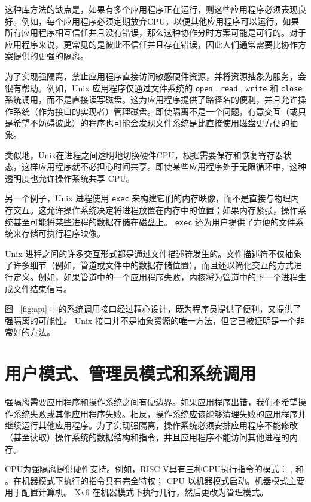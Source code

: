 \documentclass[UTF8]{article}
\begin{document}
这种库方法的缺点是，如果有多个应用程序正在运行，则这些应用程序必须表现良好。例如，每个应用程序必须定期放弃CPU，以便其他应用程序可以运行。如果所有应用程序相互信任并且没有错误，那么这种协作分时方案可能是可行的。对于应用程序来说，更常见的是彼此不信任并且存在错误，因此人们通常需要比协作方案提供的更强的隔离。  

为了实现强隔离，禁止应用程序直接访问敏感硬件资源，并将资源抽象为服务，会很有帮助。例如，Unix 应用程序仅通过文件系统的
    \lstinline{open}    ,
    \lstinline{read}    ,
    \lstinline{write}    和
    \lstinline{close}   系统调用，而不是直接读写磁盘。这为应用程序提供了路径名的便利，并且允许操作系统（作为接口的实现者）管理磁盘。即使隔离不是一个问题，有意交互（或只是希望不妨碍彼此）的程序也可能会发现文件系统是比直接使用磁盘更方便的抽象。  

类似地，Unix在进程之间透明地切换硬件CPU，根据需要保存和恢复寄存器状态，这样应用程序就不必担心时间共享。即使某些应用程序处于无限循环中，这种透明度也允许操作系统共享 CPU。  

另一个例子，Unix 进程使用
    \lstinline{exec}    来构建它们的内存映像，而不是直接与物理内存交互。这允许操作系统决定将进程放置在内存中的位置；如果内存紧张，操作系统甚至可能将某些进程的数据存储在磁盘上。
    \lstinline{exec}   还为用户提供了方便的文件系统来存储可执行程序映像。  

Unix 进程之间的许多交互形式都是通过文件描述符发生的。文件描述符不仅抽象了许多细节（例如，管道或文件中的数据存储位置），而且还以简化交互的方式进行定义。例如，如果管道中的一个应用程序失败，内核将为管道中的下一个进程生成文件结束信号。  

图~   \ref{fig:api}   中的系统调用接口经过精心设计，既为程序员提供了便利，又提供了强隔离的可能性。 Unix 接口并不是抽象资源的唯一方法，但它已被证明是一个非常好的方法。
    \section{用户模式、管理员模式和系统调用  }     

强隔离需要应用程序和操作系统之间有硬边界。如果应用程序出错，我们不希望操作系统失败或其他应用程序失败。相反，操作系统应该能够清理失败的应用程序并继续运行其他应用程序。为了实现强隔离，操作系统必须安排应用程序不能修改（甚至读取）操作系统的数据结构和指令，并且应用程序不能访问其他进程的内存。  

CPU为强隔离提供硬件支持。例如，RISC-V具有三种CPU执行指令的模式：
        ,
        和
        。在机器模式下执行的指令具有完全特权； CPU 以机器模式启动。机器模式主要用于配置计算机。 Xv6 在机器模式下执行几行，然后更改为管理模式。  
\end{document}
